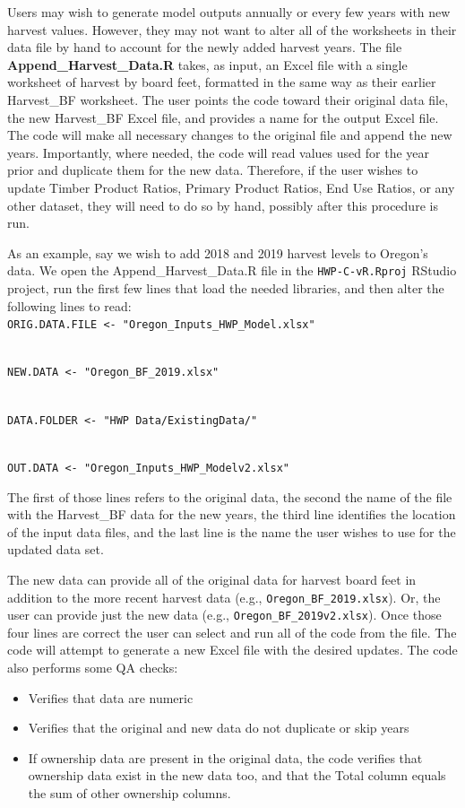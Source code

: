 \documentclass[
  openany]{book}
\begin{document}
Users may wish to generate model outputs annually or every few years with new harvest values. However, they may not want to alter all of the worksheets in their data file by hand to account for the newly added harvest years. The file \textbf{Append\_Harvest\_Data.R} takes, as input, an Excel file with a single worksheet of harvest by board feet, formatted in the same way as their earlier Harvest\_BF worksheet. The user points the code toward their original data file, the new Harvest\_BF Excel file, and provides a name for the output Excel file. The code will make all necessary changes to the original file and append the new years. Importantly, where needed, the code will read values used for the year prior and duplicate them for the new data. Therefore, if the user wishes to update Timber Product Ratios, Primary Product Ratios, End Use Ratios, or any other dataset, they will need to do so by hand, possibly after this procedure is run.

As an example, say we wish to add 2018 and 2019 harvest levels to Oregon's data. We open the Append\_Harvest\_Data.R file in the \texttt{HWP-C-vR.Rproj} RStudio project, run the first few lines that load the needed libraries, and then alter the following lines to read:\\
\texttt{ORIG.DATA.FILE\ \textless{}-\ "Oregon\_Inputs\_HWP\_Model.xlsx"}\strut \\
\texttt{NEW.DATA\ \textless{}-\ "Oregon\_BF\_2019.xlsx"}\strut \\
\texttt{DATA.FOLDER\ \textless{}-\ "HWP\ Data/ExistingData/"}\strut \\
\texttt{OUT.DATA\ \textless{}-\ "Oregon\_Inputs\_HWP\_Modelv2.xlsx"}

The first of those lines refers to the original data, the second the name of the file with the Harvest\_BF data for the new years, the third line identifies the location of the input data files, and the last line is the name the user wishes to use for the updated data set.

The new data can provide all of the original data for harvest board feet in addition to the more recent harvest data (e.g., \texttt{Oregon\_BF\_2019.xlsx}). Or, the user can provide just the new data (e.g., \texttt{Oregon\_BF\_2019v2.xlsx}). Once those four lines are correct the user can select and run all of the code from the file. The code will attempt to generate a new Excel file with the desired updates. The code also performs some QA checks:

\begin{itemize}
\item
  Verifies that data are numeric
\item
  Verifies that the original and new data do not duplicate or skip years
\item
  If ownership data are present in the original data, the code verifies that ownership data exist in the new data too, and that the Total column equals the sum of other ownership columns.
\end{itemize}
\end{document}
